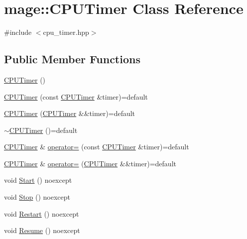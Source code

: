 \hypertarget{classmage_1_1_c_p_u_timer}{}\section{mage\+:\+:C\+P\+U\+Timer Class Reference}
\label{classmage_1_1_c_p_u_timer}


{\ttfamily \#include $<$cpu\+\_\+timer.\+hpp$>$}

\subsection*{Public Member Functions}
\begin{DoxyCompactItemize}
\item 
\hyperlink{classmage_1_1_c_p_u_timer_a398b1d5c99bcb09fbe37b2d74547b3e0}{C\+P\+U\+Timer} ()
\item 
\hyperlink{classmage_1_1_c_p_u_timer_a35d279dc760a491537099262892c62d5}{C\+P\+U\+Timer} (const \hyperlink{classmage_1_1_c_p_u_timer}{C\+P\+U\+Timer} \&timer)=default
\item 
\hyperlink{classmage_1_1_c_p_u_timer_a1f416a6188d447fb24396cc4409af7aa}{C\+P\+U\+Timer} (\hyperlink{classmage_1_1_c_p_u_timer}{C\+P\+U\+Timer} \&\&timer)=default
\item 
\hyperlink{classmage_1_1_c_p_u_timer_a32583449026cf0589104767339486d4b}{$\sim$\+C\+P\+U\+Timer} ()=default
\item 
\hyperlink{classmage_1_1_c_p_u_timer}{C\+P\+U\+Timer} \& \hyperlink{classmage_1_1_c_p_u_timer_aa453ec0f437762bff5c33ea344329d10}{operator=} (const \hyperlink{classmage_1_1_c_p_u_timer}{C\+P\+U\+Timer} \&timer)=default
\item 
\hyperlink{classmage_1_1_c_p_u_timer}{C\+P\+U\+Timer} \& \hyperlink{classmage_1_1_c_p_u_timer_aee546b06c3b665bc1868abc3d7e3a06d}{operator=} (\hyperlink{classmage_1_1_c_p_u_timer}{C\+P\+U\+Timer} \&\&timer)=default
\item 
void \hyperlink{classmage_1_1_c_p_u_timer_abcb6e468bad9fb821c18502b6445b696}{Start} () noexcept
\item 
void \hyperlink{classmage_1_1_c_p_u_timer_ae2fa5b36f436fd160d7f5b91783c0f11}{Stop} () noexcept
\item 
void \hyperlink{classmage_1_1_c_p_u_timer_aad56acfa4f2990d6894d75721ba16f15}{Restart} () noexcept
\item 
void \hyperlink{classmage_1_1_c_p_u_timer_a8285a7306896f52adb093284d6c9da4d}{Resume} () noexcept
\item 

\end{DoxyCompactItemize}
